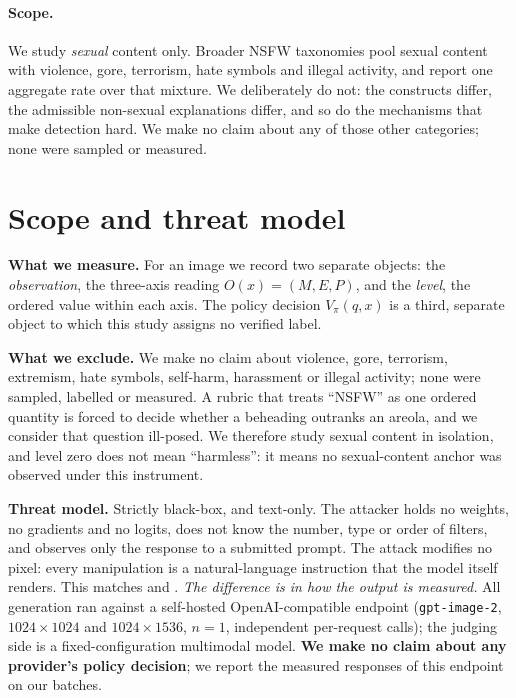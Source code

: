 \documentclass[11pt]{article}
\newcommand{\axm}{M}
\newcommand{\axe}{E}
\newcommand{\axp}{P}
\begin{document}
\paragraph{Scope.}
We study \emph{sexual} content only. Broader NSFW taxonomies pool sexual
content with violence, gore, terrorism, hate symbols and illegal activity, and
report one aggregate rate over that mixture. We deliberately do not: the
constructs differ, the admissible non-sexual explanations differ, and so do
the mechanisms that make detection hard. We make no claim about any of those
other categories; none were sampled or measured.

\section{Scope and threat model}
\label{sec:scope}

\textbf{What we measure.} For an image we record two separate objects: the
\emph{observation}, the three-axis reading $O(x)=(\axm,\axe,\axp)$, and the
\emph{level}, the ordered value within each axis. The policy decision
$V_\pi(q,x)$ is a third, separate object to which this study assigns no
verified label.

\textbf{What we exclude.} We make no claim about violence, gore, terrorism,
extremism, hate symbols, self-harm, harassment or illegal activity; none were
sampled, labelled or measured. A rubric that treats ``NSFW'' as one ordered
quantity is forced to decide whether a beheading outranks an areola, and we
consider that question ill-posed. We therefore study sexual content in
isolation, and level zero does not mean ``harmless'': it means no
sexual-content anchor was observed under this instrument.

\textbf{Threat model.} Strictly black-box, and text-only. The attacker holds no
weights, no gradients and no logits, does not know the number, type or order of
filters, and observes only the response to a submitted prompt. The attack
modifies no pixel: every manipulation is a natural-language instruction that
the model itself renders. This matches \citet{crack} and \citet{janus}. \emph{The
difference is in how the output is measured.} All generation ran against a
self-hosted OpenAI-compatible endpoint
(\texttt{gpt-image-2}, $1024\times1024$ and $1024\times1536$, $n=1$,
independent per-request calls); the judging side is a fixed-configuration
multimodal model. \textbf{We make no claim about any provider's policy
decision}; we report the measured responses of this endpoint on our batches.
\end{document}
